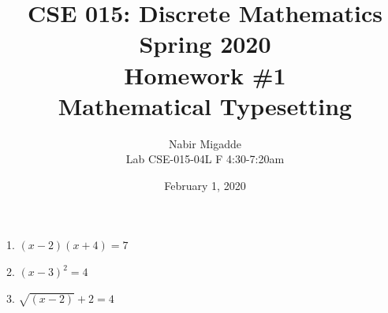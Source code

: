 \documentclass[11pt]{article}
\begin{document}
\author{Nabir Migadde\\
Lab CSE-015-04L F 4:30-7:20am}

\title{CSE 015: Discrete Mathematics\\
Spring 2020\\
Homework \#1\\
Mathematical Typesetting}

\date{February 1, 2020}
\maketitle

1.  $(x-2)(x+ 4) = 7$

2.  $(x-3)^2= 4$

3.  $\sqrt{(x-2)} + 2 = 4$
\end{document}
